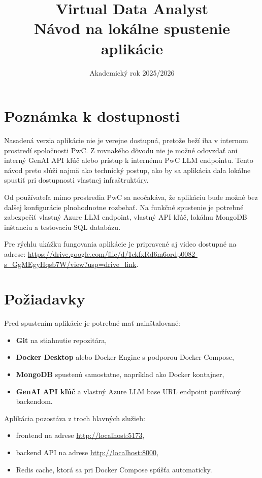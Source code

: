 \documentclass[a4paper, 12pt]{article}
\title{Virtual Data Analyst\\Návod na lokálne spustenie aplikácie}
\date{Akademický rok 2025/2026}
\begin{document}
\maketitle
\clearpage

\section*{Poznámka k dostupnosti}

Nasadená verzia aplikácie nie je verejne dostupná, pretože beží iba v internom prostredí spoločnosti PwC. Z rovnakého dôvodu nie je možné odovzdať ani interný GenAI API kľúč alebo prístup k internému PwC LLM endpointu. Tento návod preto slúži najmä ako technický postup, ako by sa aplikácia dala lokálne spustiť pri dostupnosti vlastnej infraštruktúry.

Od používateľa mimo prostredia PwC sa neočakáva, že aplikáciu bude možné bez ďalšej konfigurácie plnohodnotne rozbehať. Na funkčné spustenie je potrebné zabezpečiť vlastný Azure LLM endpoint, vlastný API kľúč, lokálnu MongoDB inštanciu a testovaciu SQL databázu.

Pre rýchlu ukážku fungovania aplikácie je pripravené aj video dostupné na adrese: \url{https://drive.google.com/file/d/1ckfxRd6m6ordp0082-s_GgMEgyHqsb7W/view?usp=drive_link}.

\section{Požiadavky}

Pred spustením aplikácie je potrebné mať nainštalované:

\begin{itemize}
    \item \textbf{Git} na stiahnutie repozitára,
    \item \textbf{Docker Desktop} alebo Docker Engine s podporou Docker Compose,
    \item \textbf{MongoDB} spustenú samostatne, napríklad ako Docker kontajner,
    \item \textbf{GenAI API kľúč} a vlastný Azure LLM base URL endpoint používaný backendom.
\end{itemize}

Aplikácia pozostáva z troch hlavných služieb:

\begin{itemize}
    \item frontend na adrese \url{http://localhost:5173},
    \item backend API na adrese \url{http://localhost:8000},
    \item Redis cache, ktorá sa pri Docker Compose spúšťa automaticky.
\end{itemize}
\end{document}
